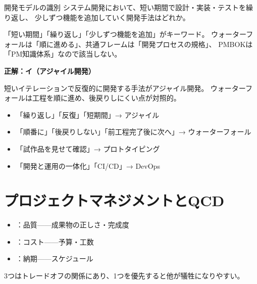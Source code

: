\begin{reidai}{開発モデルの識別}
システム開発において、短い期間で設計・実装・テストを繰り返し、
少しずつ機能を追加していく開発手法はどれか。

\end{reidai}

\begin{shishin}
「短い期間」「繰り返し」「少しずつ機能を追加」がキーワード。
ウォーターフォールは「順に進める」、共通フレームは「開発プロセスの規格」、
PMBOKは「PM知識体系」なので該当しない。
\end{shishin}

\begin{kaitou}
\textbf{正解：イ（アジャイル開発）}

短いイテレーションで反復的に開発する手法がアジャイル開発。
ウォーターフォールは工程を順に進め、後戻りしにくい点が対照的。
\end{kaitou}

\begin{minuki}[見抜き方]
\begin{itemize}
  \item 「繰り返し」「反復」「短期間」→ アジャイル
  \item 「順番に」「後戻りしない」「前工程完了後に次へ」→ ウォーターフォール
  \item 「試作品を見せて確認」→ プロトタイピング
  \item 「開発と運用の一体化」「CI/CD」→ DevOps
\end{itemize}
\end{minuki}

\section{プロジェクトマネジメントとQCD}

\begin{teigi}
\begin{itemize}
  \item {}：品質——成果物の正しさ・完成度
  \item {}：コスト——予算・工数
  \item {}：納期——スケジュール
\end{itemize}
3つはトレードオフの関係にあり、1つを優先すると他が犠牲になりやすい。
\end{teigi}

